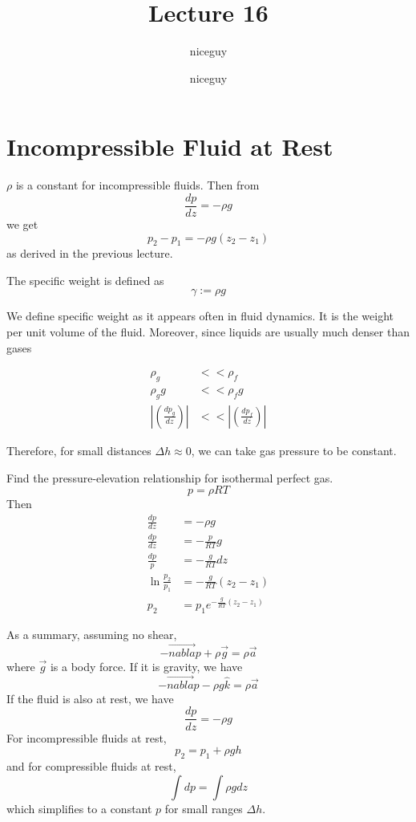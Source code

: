 \documentclass[12pt]{article}
\author{niceguy}
\title{Lecture 16}
\author{niceguy}
\begin{document}
\maketitle

\section{Incompressible Fluid at Rest}
$\rho$ is a constant for incompressible fluids. Then from
$$\frac{dp}{dz} = -\rho g$$
we get
$$p_2-p_1 = -\rho g(z_2-z_1)$$
as derived in the previous lecture. 

\begin{defn}
	The specific weight is defined as
	$$\gamma := \rho g$$
\end{defn}

We define specific weight as it appears often in fluid dynamics. It is the weight per unit volume of the fluid. Moreover, since liquids are usually much denser than gases

\begin{align*}
	\rho_g &<< \rho_f \\
	\rho_g g &<< \rho_f g \\
	\left|\left(\frac{dp_g}{dz}\right)\right| &<< \left|\left(\frac{dp_f}{dz}\right)\right|
\end{align*}

Therefore, for small distances $\Delta h \approx 0$, we can take gas pressure to be constant.

\begin{ex}
	Find the pressure-elevation relationship for isothermal perfect gas.
	$$p = \rho RT$$
	Then
	\begin{align*}
		\frac{dp}{dz} &= -\rho g \\
		\frac{dp}{dz} &= -\frac{p}{RT} g \\
		\frac{dp}{p} &= -\frac{g}{RT}dz \\
	\ln\frac{p_2}{p_1} &= -\frac{g}{RT}(z_2-z_1) \\
	p_2 &= p_1e^{-\frac{g}{RT}(z_2-z_1)}
\end{align*}
\end{ex}

As a summary, assuming no shear,
$$-\vec{nabla}p + \rho\vec{g} = \rho\vec{a}$$
where $\vec{g}$ is a body force. If it is gravity, we have
$$-\vec{nabla}p - \rho g\hat{k} = \rho\vec{a}$$
If the fluid is also at rest, we have
$$\frac{dp}{dz} = -\rho g$$
For incompressible fluids at rest,
$$p_2 = p_1+\rho gh$$
and for compressible fluids at rest,
$$\int dp = \int \rho gdz$$
which simplifies to a constant $p$ for small ranges $\Delta h$.
\end{document}
